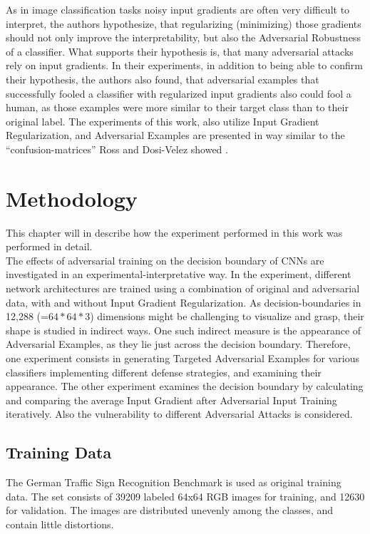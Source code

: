 \documentclass[draft,final]{vutinfth} %
\begin{document}
As in image classification tasks noisy input gradients are often very difficult to interpret, the authors hypothesize, that regularizing (minimizing) those gradients should not only improve the interpretability, but also the Adversarial Robustness of a classifier.
What supports their hypothesis is, that many adversarial attacks rely on input gradients.
In their experiments, in addition to being able to confirm their hypothesis, the authors also found, that adversarial examples that successfully fooled a classifier with regularized input gradients also could fool a human, as those examples were more similar to their target class than to their original label.
The experiments of this work, also utilize Input Gradient Regularization, and Adversarial Examples are presented in way similar to the "`confusion-matrices"' Ross and Dosi-Velez showed \cite{Ross2017}.



\chapter{Methodology}

This chapter will in describe how the experiment performed in this work was performed in detail. \\
The effects of adversarial training on the decision boundary of CNNs are investigated in an experimental-interpretative way.
In the experiment, different network architectures are trained using a combination of original and adversarial data, with and without Input Gradient Regularization.
As decision-boundaries in 12,288 (=$64*64*3$) dimensions might be challenging to visualize and grasp, their shape is studied in indirect ways.
One such indirect measure is the appearance of Adversarial Examples, as they lie just across the decision boundary.
Therefore, one experiment consists in generating Targeted Adversarial Examples for various classifiers implementing different defense strategies, and examining their appearance.
The other experiment examines the decision boundary by calculating and comparing the average Input Gradient after Adversarial Input Training iteratively.
Also the vulnerability to different Adversarial Attacks is considered.

\section{Training Data}

The German Traffic Sign Recognition Benchmark is used as original training data. The set consists of 39209 labeled 64x64 RGB images for training, and 12630 for validation.
The images are distributed unevenly among the classes, and contain little distortions.
\end{document}
